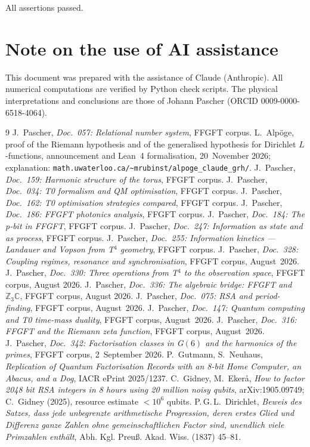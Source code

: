 All assertions passed.

\section*{Note on the use of AI assistance}

This document was prepared with the assistance of Claude (Anthropic).
All numerical computations are verified by Python check scripts.
The physical interpretations and conclusions are those of Johann Pascher
(ORCID 0009-0000-6518-4064).

\begin{thebibliography}{9}
 J.~Pascher, \textit{Doc.~057: Relational number system}, FFGFT corpus.
 L.~Alpöge, proof of the Riemann hypothesis and of the generalised hypothesis for Dirichlet $L$-functions, announcement and Lean~4 formalisation, 20~November 2026; explanation: \texttt{math.uwaterloo.ca/\allowbreak\textasciitilde mrubinst/\allowbreak alpoge\_claude\_grh/}.
 J.~Pascher, \textit{Doc.~159: Harmonic structure of the torus}, FFGFT corpus.
 J.~Pascher, \textit{Doc.~034: T0 formalism and QM optimisation}, FFGFT corpus.
 J.~Pascher, \textit{Doc.~162: T0 optimisation strategies compared}, FFGFT corpus.
 J.~Pascher, \textit{Doc.~186: FFGFT photonics analysis}, FFGFT corpus.
 J.~Pascher, \textit{Doc.~184: The p-bit in FFGFT}, FFGFT corpus.
 J.~Pascher, \textit{Doc.~247: Information as state and as process}, FFGFT corpus.
 J.~Pascher, \textit{Doc.~255: Information kinetics --- Landauer and Vopson from T$^4$ geometry}, FFGFT corpus.
 J.~Pascher, \textit{Doc.~328: Coupling regimes, resonance and synchronisation}, FFGFT corpus, August~2026.
 J.~Pascher, \textit{Doc.~330: Three operations from T$^4$ to the observation space}, FFGFT corpus, August 2026.
 J.~Pascher, \textit{Doc.~336: The algebraic bridge: FFGFT and $\mathbb{Z}_3\mathbb{C}$}, FFGFT corpus, August 2026.
 J.~Pascher, \textit{Doc.~075: RSA and period-finding}, FFGFT corpus, August~2026.
 J.~Pascher, \textit{Doc.~147: Quantum computing and T0 time-mass duality}, FFGFT corpus, August~2026.
 J.~Pascher, \textit{Doc.~316: FFGFT and the Riemann zeta function}, FFGFT corpus, August~2026.
 J.~Pascher, \textit{Doc.~342: Factorisation classes in G$(6)$ and the harmonics of the primes}, FFGFT corpus, 2~September 2026.
 P.~Gutmann, S.~Neuhaus, \textit{Replication of Quantum Factorisation Records with an 8-bit Home Computer, an Abacus, and a Dog}, IACR ePrint 2025/1237.
 C.~Gidney, M.~Ekerå, \textit{How to factor 2048 bit RSA integers in 8 hours using 20 million noisy qubits}, arXiv:1905.09749; C.~Gidney (2025), resource estimate $<10^6$ qubits.
 P.\,G.\,L.~Dirichlet, \textit{Beweis des Satzes, dass jede unbegrenzte arithmetische Progression, deren erstes Glied und Differenz ganze Zahlen ohne gemeinschaftlichen Factor sind, unendlich viele Primzahlen enthält}, Abh. Kgl. Preuß. Akad. Wiss. (1837) 45--81.
\end{thebibliography}

